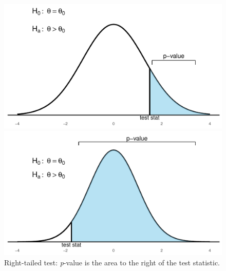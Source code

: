 \begin{figure}[H]
  \centering
  \begin{minipage}[t]{0.48\textwidth}
    \centering
    \includegraphics[width=\linewidth]{section11/images/hypothesis_right_tail.pdf}
  \end{minipage}
  \hfill
  \begin{minipage}[t]{0.48\textwidth}
    \centering
    \includegraphics[width=\linewidth]{section11/images/hypothesis_right_tail_wide.pdf}
  \end{minipage}
  \caption*{Right-tailed test: \textit{p}-value is the area to the right of the test statistic.}
\end{figure}


